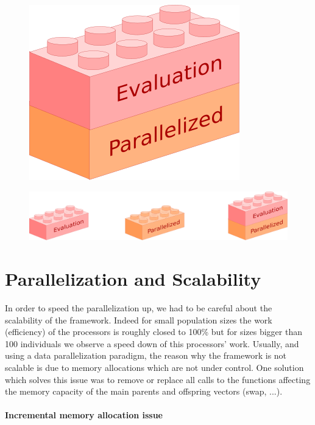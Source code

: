 \begin{figure}[H]
  \centering
  \includegraphics[scale=0.5]{images/evaluation_parallelized_boxes}
\end{figure}

\begin{figure}[H]
  \centering
  \includegraphics[scale=0.5]{images/evaluation_plus_parallelized_boxes}
\end{figure}

\section{Parallelization and Scalability}

In order to speed the parallelization up, we had to be careful about the scalability of the framework. Indeed for small population sizes the work (efficiency) of the processors is roughly closed to 100\% but for sizes bigger than 100 individuals we observe a speed down of this processors' work. Usually, and using a data parallelization paradigm, the reason why the framework is not scalable is due to memory allocations which are not under control. One solution which solves this issue was to remove or replace all calls to the functions affecting the memory capacity of the main parents and offspring vectors (swap, ...).

\paragraph{Incremental memory allocation issue}

